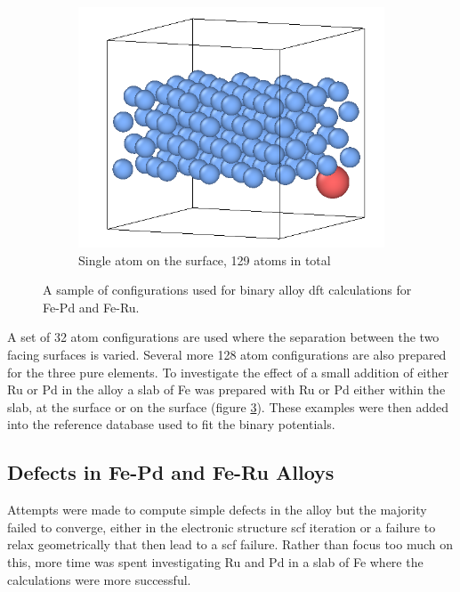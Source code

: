\begin{figure}[htb]
\begin{subfigure}{.32\textwidth}
  \label{fig:sub-first}
\end{subfigure}
\begin{subfigure}{.32\textwidth}
  \centering
  \includegraphics[width=.94\linewidth]{chapters/potentials_fe_pd_ru/slabs/slab03.png}  
  \caption{Single atom on the surface, 129 atoms in total}
  \label{fig:sub-first}
\end{subfigure}
\caption{A sample of configurations used for binary alloy \acrshort{dft} calculations for Fe-Pd and Fe-Ru.}
\label{fig:binaryalloyconfigurationsslab}
\end{figure}

A set of 32 atom configurations are used where the separation between the two facing surfaces is varied.  Several more 128 atom configurations are also prepared for the three pure elements.  To investigate the effect of a small addition of either Ru or Pd in the alloy a slab of Fe was prepared with Ru or Pd either within the slab, at the surface or on the surface (figure \ref{fig:binaryalloyconfigurationsslab}).  These examples were then added into the reference database used to fit the binary potentials.



\FloatBarrier
\subsection{Defects in Fe-Pd and Fe-Ru Alloys}

Attempts were made to compute simple defects in the alloy but the majority failed to converge, either in the electronic structure \acrshort{scf} iteration or a failure to relax geometrically that then lead to a \acrshort{scf} failure.  Rather than focus too much on this, more time was spent investigating Ru and Pd in a slab of Fe where the calculations were more successful.















